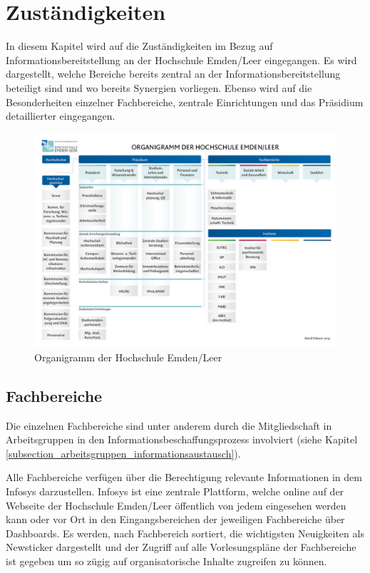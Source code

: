 \section{Zuständigkeiten}
\label{section_zustaendigkeiten}
In diesem Kapitel wird auf die Zuständigkeiten im Bezug auf Informationsbereitstellung an der Hochschule Emden/Leer eingegangen. Es wird dargestellt, welche Bereiche bereits zentral an der Informationsbereitstellung beteiligt sind und wo bereits Synergien vorliegen. Ebenso wird auf die Besonderheiten einzelner Fachbereiche, zentrale Einrichtungen und das Präsidium detaillierter eingegangen. 

\begin{figure}[h!]
	\centering
	\includegraphics[width=14cm]{kapitel/gruppe2/bilder/organigramm_HS}
	\caption{Organigramm der Hochschule Emden/Leer}
	\label{fig_organigramm_HS}
\end{figure}


\subsection{Fachbereiche}
Die einzelnen Fachbereiche sind unter anderem durch die Mitgliedschaft in Arbeitsgruppen in den Informationsbeschaffungsprozess involviert (siehe Kapitel \ref{subsection_arbeitsgruppen_informationsaustausch}). 

Alle Fachbereiche verfügen über die Berechtigung relevante Informationen in dem Infosys darzustellen. Infosys ist eine zentrale Plattform, welche online auf der Webseite der Hochschule Emden/Leer öffentlich von jedem eingesehen werden kann oder vor Ort  in den Eingangsbereichen der jeweiligen Fachbereiche über Dashboards. Es werden, nach Fachbereich sortiert, die wichtigsten Neuigkeiten als Newsticker dargestellt und der Zugriff auf alle Vorlesungspläne der Fachbereiche ist gegeben um so zügig auf organisatorische Inhalte zugreifen zu können.

